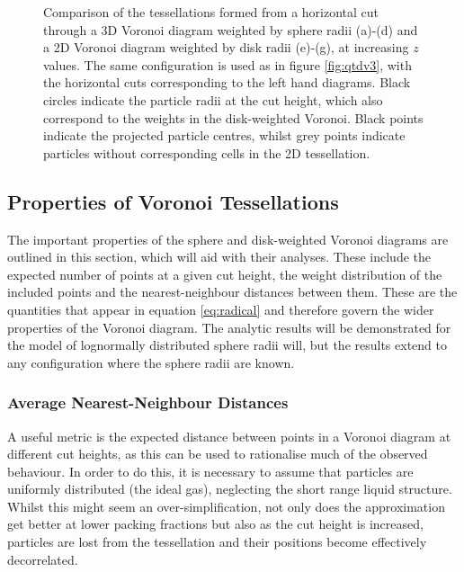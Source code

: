 \begin{figure}[tb]
\begin{subfigure}[b]{0.23\textwidth}
     \end{subfigure}
     
\caption{Comparison of the tessellations formed from a horizontal cut through a 3D Voronoi diagram weighted by sphere radii (a)-(d) and a 2D Voronoi diagram weighted by disk radii (e)-(g), at increasing $z$ values.
	The same configuration is used as in figure \ref{fig:qtdv3}, with the horizontal cuts corresponding to the left hand diagrams.
	Black circles indicate the particle radii at the cut height, which also correspond to the weights in the disk\--weighted Voronoi. Black points indicate the projected particle centres, whilst grey points indicate particles without corresponding cells in the 2D tessellation.}
	\label{fig:vorcuts}
\end{figure}

\subsection{Properties of Voronoi Tessellations}

The important properties of the sphere and disk\--weighted Voronoi diagrams are outlined in this section, which will aid with their analyses.
These include the expected number of points at a given cut height, the weight distribution of the included points and the nearest\--neighbour distances between them.
These are the quantities that appear in equation \eqref{eq:radical} and therefore govern the wider properties of the Voronoi diagram. 
The analytic results will be demonstrated for the model of lognormally distributed sphere radii will, but the results extend to any configuration where the sphere radii are known.

\subsubsection{Average Nearest\--Neighbour Distances}

A useful metric is the expected distance between points in a Voronoi diagram at different cut heights, as this can be used to rationalise much of the observed behaviour.
In order to do this, it is necessary to assume that particles are uniformly distributed (the ideal gas), neglecting the short range liquid structure.
Whilst this might seem an over\--simplification, not only does the approximation get better at lower packing fractions but also as the cut height is increased, particles are lost from the tessellation and their positions become effectively decorrelated. 


